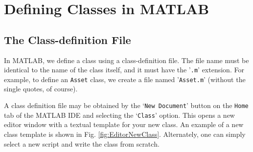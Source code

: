 \section{Defining Classes in MATLAB}

\subsection{The Class-definition File}
In MATLAB, we define a class using a class-definition file. The file name must be identical to the name of the class itself, and it must have the '\texttt{.m}' extension. For example, to define an \texttt{Asset} class, we create a file named '\texttt{Asset.m}' (without the single quotes, of course).

A class definition file may be obtained by the `\texttt{New Document}' button on the \texttt{Home} tab of the MATLAB IDE and selecting the `\texttt{Class}' option. This opens a new editor window with a textual template for your new class. An example of a new class template is shown in Fig. \ref{fig:EditorNewClass}. Alternately, one can simply select a new script and write the class from scratch.

